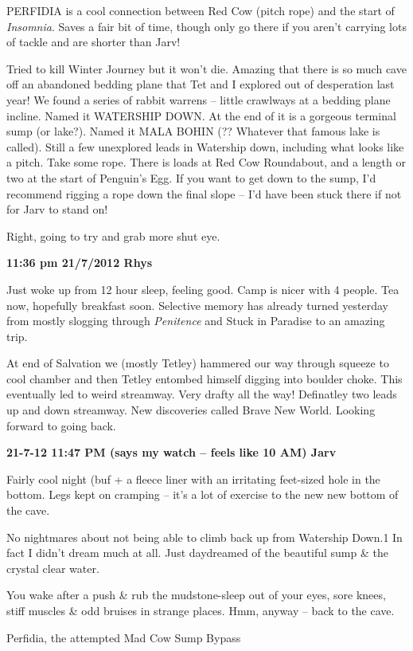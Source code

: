 PERFIDIA is a cool connection between Red Cow (pitch rope) and the start
of \emph{Insomnia}. Saves a fair bit of time, though only go there if
you aren't carrying lots of tackle and are shorter than Jarv!

Tried to kill Winter Journey but it won't die. Amazing that there is so
much cave off an abandoned bedding plane that Tet and I explored out of
desperation last year! We found a series of rabbit warrens -- little
crawlways at a bedding plane incline. Named it WATERSHIP DOWN. At the
end of it is a gorgeous terminal sump (or lake?). Named it MALA BOHIN
(?? Whatever that famous lake is called). Still a few unexplored leads
in Watership down, including what looks like a pitch. Take some rope.
There is loads at Red Cow Roundabout, and a length or two at the start
of Penguin's Egg. If you want to get down to the sump, I'd recommend
rigging a rope down the final slope -- I'd have been stuck there if not
for Jarv to stand on!

Right, going to try and grab more shut eye.

\textbf{11:36 pm 21/7/2012 Rhys}

Just woke up from 12 hour sleep, feeling good. Camp is nicer with 4
people. Tea now, hopefully breakfast soon. Selective memory has already
turned yesterday from mostly slogging through \emph{Penitence} and Stuck
in Paradise to an amazing trip.

At end of Salvation we (mostly Tetley) hammered our way through squeeze
to cool chamber and then Tetley entombed himself digging into boulder
choke. This eventually led to weird streamway. Very drafty all the way!
Definatley two leads up and down streamway. New discoveries called Brave
New World. Looking forward to going back.

\textbf{21-7-12 11:47 PM (says my watch -- feels like 10 AM) Jarv}

Fairly cool night (buf + a fleece liner with an irritating feet-sized
hole in the bottom. Legs kept on cramping -- it's a lot of exercise to
the new new bottom of the cave.

No nightmares about not being able to climb back up from Watership
Down.1 In fact I didn't dream much at all. Just daydreamed of the
beautiful sump \& the crystal clear water.

You wake after a push \& rub the mudstone-sleep out of your eyes, sore
knees, stiff muscles \& odd bruises in strange places. Hmm, anyway --
back to the cave.

Perfidia, the attempted Mad Cow Sump Bypass

